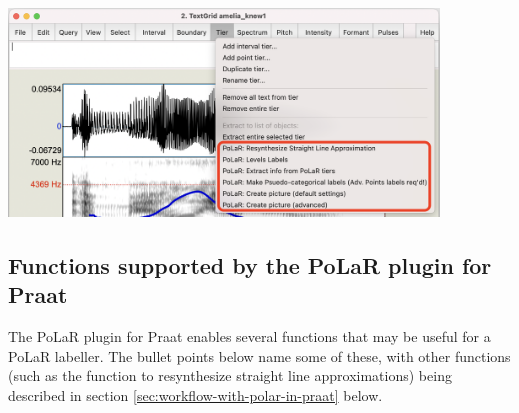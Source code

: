 \documentclass[11pt, twoside]{memoir}
\begin{document}
\begin{itemize}
\begin{itemize}
			\includegraphics[width=4.5in]{Practical-Plugin-2-Tier-Menu-Scripts.png}
	\end{itemize}
\end{itemize}

\subsection{Functions supported by the PoLaR plugin for Praat}
The PoLaR plugin for Praat enables several functions that may be useful for a PoLaR labeller. The bullet points below name some of these, with other functions (such as the function to resynthesize straight line approximations) being described in section \ref{sec:workflow-with-polar-in-praat} below.
\end{document}
